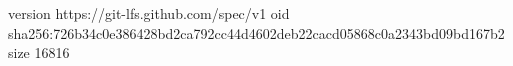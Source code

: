 version https://git-lfs.github.com/spec/v1
oid sha256:726b34c0e386428bd2ca792cc44d4602deb22cacd05868c0a2343bd09bd167b2
size 16816
